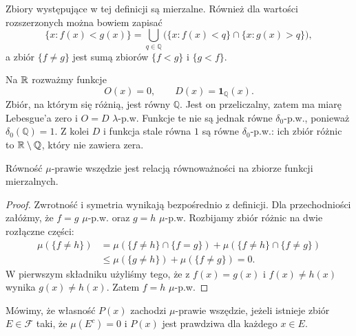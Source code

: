 Zbiory występujące w tej definicji są mierzalne. Również dla wartości
rozszerzonych można bowiem zapisać
\[
  \{x:f(x)<g(x)\}
  =\bigcup_{q\in\mathbb{Q}}
    \bigl(\{x:f(x)<q\}\cap\{x:g(x)>q\}\bigr),
\]
a zbiór $\{f\neq g\}$ jest sumą zbiorów $\{f<g\}$ i $\{g<f\}$.

\begin{przyklad}
\label{prz:dirichlet-prawie-wszedzie}
Na $\mathbb{R}$ rozważmy funkcje
\[
  O(x)=0,\qquad D(x)=\mathbf{1}_{\mathbb{Q}}(x).
\]
Zbiór, na którym się różnią, jest równy $\mathbb{Q}$.
Jest on przeliczalny, zatem ma miarę Lebesgue'a zero i
$O=D$ $\lambda$-p.w. Funkcje te nie są jednak równe $\delta_0$-p.w.,
ponieważ $\delta_0(\mathbb{Q})=1$.
Z kolei $D$ i funkcja stale równa $1$ są równe $\delta_0$-p.w.:
ich zbiór różnic to $\mathbb{R}\setminus\mathbb{Q}$, który nie zawiera zera.
\end{przyklad}

\begin{twierdzenie}
\label{tw:prawie-wszedzie-rownowaznosc}
Równość $\mu$-prawie wszędzie jest relacją równoważności
na zbiorze funkcji mierzalnych.
\end{twierdzenie}

\begin{proof}
Zwrotność i symetria wynikają bezpośrednio z definicji.
Dla przechodniości załóżmy, że $f=g$ $\mu$-p.w. oraz
$g=h$ $\mu$-p.w. Rozbijamy zbiór różnic na dwie rozłączne części:
\begin{align*}
  \mu(\{f\neq h\})
    &=\mu(\{f\neq h\}\cap\{f=g\})
      +\mu(\{f\neq h\}\cap\{f\neq g\})\\
    &\leq\mu(\{g\neq h\})+\mu(\{f\neq g\})=0.
\end{align*}
W pierwszym składniku użyliśmy tego, że z $f(x)=g(x)$ i
$f(x)\neq h(x)$ wynika $g(x)\neq h(x)$.
Zatem $f=h$ $\mu$-p.w.
\end{proof}

\begin{definicja}
\label{def:wlasnosc-prawie-wszedzie}
Mówimy, że własność $P(x)$ zachodzi $\mu$-prawie wszędzie,
jeżeli istnieje zbiór $E\in\mathcal{F}$ taki, że
$\mu(E^c)=0$ i $P(x)$ jest prawdziwa dla każdego $x\in E$.
\end{definicja}
